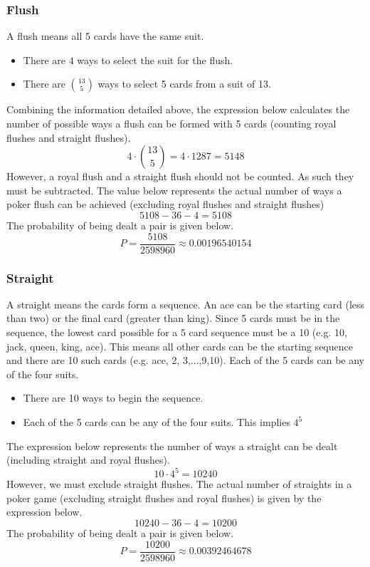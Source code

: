 \subsubsection*{Flush}
A flush means all 5 cards have the same suit.  
\begin{itemize}
    \item There are $4$ ways to select the suit for the flush.
    \item There are $\binom{13}{5}$ ways to select 5 cards from a suit of 13.
\end{itemize}
Combining the information detailed above, the expression below calculates the number of possible ways a flush can be formed with 5 cards (counting royal flushes and straight flushes).
$$4 \cdot \binom{13}{5} = 4 \cdot 1287 = 5148$$
However, a royal flush and a straight flush should not be counted.  As such they must be subtracted.  The value below represents the actual number of ways a poker flush can be achieved (excluding royal flushes and straight flushes)
$$5108 - 36 - 4 = 5108$$
The probability of being dealt a pair is given below.
$$P = \frac{5108}{2598960} \approx 0.00196540154$$

\subsubsection*{Straight}
A straight means the cards form a sequence.
An ace can be the starting card (less than two) or the final card (greater than king).  Since 5 cards must be in the sequence, the lowest card possible for a 5 card sequence must be a 10 (e.g. 10, jack, queen, king, ace).  This means all other cards can be the starting sequence and there are 10 such cards (e.g. ace, 2, 3,...,9,10).  Each of the 5 cards can be any of the four suits.  
\begin{itemize}
    \item There are 10 ways to begin the sequence.
    \item Each of the 5 cards can be any of the four suits.  This implies $4^5$
\end{itemize}
The expression below represents the number of ways a straight can be dealt (including straight and royal flushes).
$$10 \cdot 4^5 = 10240$$
However, we must exclude straight flushes.  The actual number of straights in a poker game (excluding straight flushes and royal flushes) is given by the expression below.
$$10240 - 36-4 = 10200$$
The probability of being dealt a pair is given below.
$$P = \frac{10200}{2598960} \approx 0.00392464678$$

